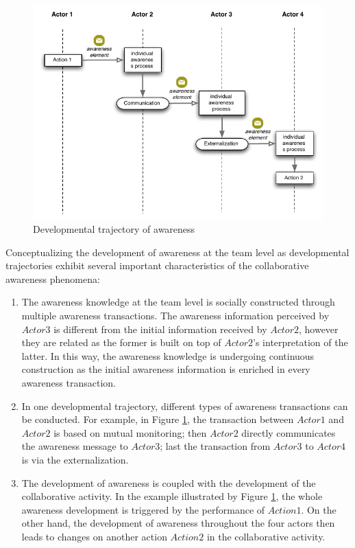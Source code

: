 \begin{figure}[htbp] %
   \centering
   \includegraphics{developmental_trajectory.pdf} 
   \caption{Developmental trajectory of awareness}
   \label{fig:developmental_trajectory}
\end{figure}

Conceptualizing the development of awareness at the team level as developmental trajectories exhibit several important characteristics of the collaborative awareness phenomena:

\begin{enumerate}
	\item The awareness knowledge at the team level is socially constructed through multiple awareness transactions. The awareness information perceived by $Actor3$ is different from the initial information received by $Actor2$, however they are related as the former is built on top of $Actor2$'s interpretation of the latter. In this way, the awareness knowledge is undergoing continuous construction as the initial awareness information is enriched in every awareness transaction.
	\item In one developmental trajectory, different types of awareness transactions can be conducted. For example, in Figure \ref{fig:developmental_trajectory}, the transaction between $Actor1$ and $Actor2$ is based on mutual monitoring; then $Actor2$ directly communicates the awareness message to $Actor3$; last the transaction from $Actor3$ to $Actor4$ is via the externalization. 
	\item The development of awareness is coupled with the development of the collaborative activity. In the example illustrated by Figure \ref{fig:developmental_trajectory}, the whole awareness development is triggered by the performance of $Action1$. On the other hand, the development of awareness throughout the four actors then leads to changes on another action $Action2$ in the collaborative activity. 
\end{enumerate}

